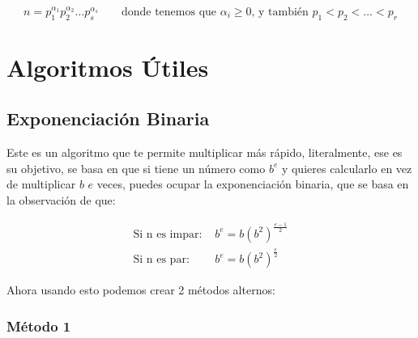 \documentclass[12pt, fleqn]{report}                             %
\DeclareMathOperator \Space {\quad}                             %
\begin{document}
            \begin{equation}
                n = p_1^{\alpha_1}p_2^{\alpha_2} \dots p_s^{\alpha_s}
                \Space
                \text{ donde tenemos que }
                \alpha_i \geq 0 \text{, y también } p_1 < p_2 < \dots < p_r
            \end{equation}








\chapter{Algoritmos Útiles}
    \clearpage

    \section{Exponenciación Binaria}

        Este es un algoritmo que te permite multiplicar más rápido, literalmente, ese es 
        su objetivo, se basa en que si tiene un número como $b^e$ y quieres calcularlo
        en vez de multiplicar $b$ $e$ veces, puedes ocupar la exponenciación binaria, 
        que se basa en la observación de que:

        \begin{equation}
        \begin{split}
            \text{Si n es impar: }  &   b^e = b (b^2)^{\frac{e-1}{2}}   \\
            \text{Si n es par: }    &   b^e = b (b^2)^{\frac{e}{2}}
        \end{split}
        \end{equation}


        Ahora usando esto podemos crear 2 métodos alternos:

        \clearpage
        \subsection*{Método 1}
\end{document}
